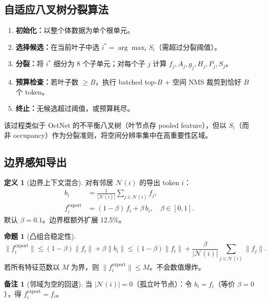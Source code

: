 \documentclass[11pt,a4paper]{article}
\theoremstyle{definition}
\newtheorem{definition}{定义}[section]
\newtheorem{proposition}{命题}[section]
\newtheorem{remark}{备注}[section]
\begin{document}
\subsection{自适应八叉树分裂算法}

\begin{enumerate}
    \item \textbf{初始化：}以整个体数据为单个根单元。
    \item \textbf{选择候选：}在当前叶子中选 $i^* = \arg\max_i S_i$（需超过分裂阈值）。
    \item \textbf{分裂：}将 $i^*$ 细分为 8 个子单元；对每个子 $j$ 计算 $f_j, A_j, g_j, H_j, P_j, S_j$。
    \item \textbf{预算检查：}若叶子数 $\geq B$，执行 batched top-$B$ + 空间 NMS 裁剪到恰好 $B$ 个 token。
    \item \textbf{终止：}无候选超过阈值，或预算耗尽。
\end{enumerate}

该过程类似于 OctNet 的不平衡八叉树（叶节点存 pooled feature），但以 $S_i$（而非 occupancy）作为分裂准则，将空间分辨率集中在高重要性区域。


\subsection{边界感知导出}

\begin{definition}[边界上下文混合]
对有邻居 $\mathcal{N}(i)$ 的导出 token $i$：
\begin{align}
b_i &= \frac{1}{|\mathcal{N}(i)|} \sum_{j \in \mathcal{N}(i)} f_j, \label{eq:neighbor}\\
f_i^{\mathrm{export}} &= (1 - \beta)\, f_i + \beta\, b_i, \quad \beta \in [0,1]. \label{eq:export}
\end{align}
默认 $\beta = 0.1$。边界框额外扩展 12.5\%。
\end{definition}

\begin{proposition}[凸组合稳定性]
\begin{equation}
\|f_i^{\mathrm{export}}\| \leq (1-\beta)\|f_i\| + \beta\|b_i\|
\leq (1-\beta)\|f_i\| + \frac{\beta}{|\mathcal{N}(i)|}\sum_{j \in \mathcal{N}(i)} \|f_j\|.
\end{equation}
若所有特征范数以 $M$ 为界，则 $\|f_i^{\mathrm{export}}\| \leq M$。不会数值爆炸。
\end{proposition}

\begin{remark}[邻域为空的回退]
当 $|\mathcal{N}(i)|=0$（孤立叶节点）：令 $b_i = f_i$（等价 $\beta=0$），得 $f_i^{\mathrm{export}}=f_i$。
\end{remark}
\end{document}

